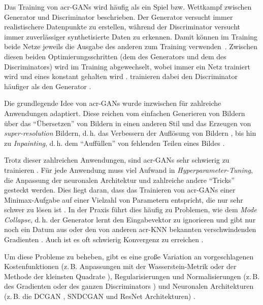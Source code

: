 Das Training von \gls{acr-GAN}s wird häufig als ein Spiel bzw. Wettkampf
zwischen Generator und Discriminator beschrieben.
Der Generator versucht immer realistischere Datenpunkte
zu erstellen, während der Discriminator versucht immer zuverlässiger
synthetisierte Daten zu erkennen. Damit können im Training beide Netze jeweils
die Ausgabe des anderen zum Training verwenden~\cite{raschka2019}.
Zwischen diesen beiden Optimierungsschritten (dem des Generators und dem des
Discriminators) wird im Training abgewechselt, wobei immer ein Netz trainiert
wird und eines konstant gehalten wird \cite{raschka2019}. 
trainieren dabei den Discriminator häufiger als den Generator \cite{goodfellow2014generative}.

Die grundlegende Idee von \gls{acr-GAN}s wurde inzwischen für zahlreiche
Anwendungen adaptiert. Diese reichen vom einfachen Generieren von Bildern
\cite{goodfellow2014generative, arjovsky2017wasserstein,
gulrajani2017improved,kurach2018gan, miyato2018spectral} über das \enquote{Übersetzen}
von Bildern in einen anderen Stil
\cite{pang2021image,isola2017image,zhu2017unpaired,
liu2019few,saito2020coco,anokhin2020high} und das Erzeugen von
\emph{super-resolution} Bildern, d.\,h. das Verbessern der Auflösung von Bildern
\cite{pang2021image,anokhin2020high,ledig2017photo}, bis hin zu
\emph{Inpainting}, d.\,h. dem \enquote{Auffüllen} von fehlenden Teilen eines Bildes
\cite{pang2021image,isola2017image, demir2018patch}.

Trotz dieser zahlreichen Anwendungen, sind \gls{acr-GAN}s sehr schwierig zu
trainieren \cite{kurach2018gan}. Für jede Anwendung muss viel Aufwand in
\emph{Hyperparameter-Tuning}, die Anpassung der neuronalen Architektur und
zahlreiche andere \enquote{Tricks} \cite[vgl.][]{kurach2018gan} gesteckt werden. Dies
liegt daran, dass das Trainieren von \gls{acr-GAN}s einer
Minimax-Aufgabe auf einer Vielzahl von Parametern entspricht, die nur sehr
schwer zu lösen ist \cite{kurach2018gan}. In der Praxis führt dies häufig
zu Problemen, wie dem \emph{Mode Collapse}, d.\,h. der Generator lernt den
Eingabevektor zu ignorieren und gibt nur noch ein Datum aus \cite{pang2021image} oder den von anderen \gls{acr-KNN} bekannten verschwindenden
Gradienten \cite{arjovsky2017towards}. Auch ist es oft schwierig
Konvergenz zu erreichen \cite{pang2021image}.

Um diese Probleme zu beheben, gibt es eine große Variation an vorgeschlagenen
Kostenfunktionen (z.\,B. Anpassungen mit der Wasserstein-Metrik
\cite{arjovsky2017wasserstein} oder der Methode der kleinsten Quadrate \cite{kurach2018gan}), Regularisierungen und Normalisierungen (z.\,B. des
Gradienten oder des ganzen Discriminators \cite{kurach2018gan}) und 
Neuronalen Architekturen (z.\,B. die DCGAN \cite{radford2015unsupervised},
SNDCGAN \cite{miyato2018spectral} und ResNet \cite{zhu2017unpaired}
Architekturen) \cite[vgl.][S. 1,3]{kurach2018gan}.


